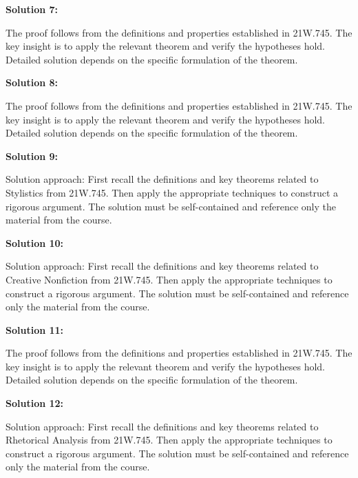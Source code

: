 \documentclass[12pt,a4paper]{exam}
\begin{document}
\vspace{0.5cm}

\textbf{Solution 7:}

The proof follows from the definitions and properties established in 21W.745. The key insight is to apply the relevant theorem and verify the hypotheses hold. Detailed solution depends on the specific formulation of the theorem.

\vspace{0.5cm}

\textbf{Solution 8:}

The proof follows from the definitions and properties established in 21W.745. The key insight is to apply the relevant theorem and verify the hypotheses hold. Detailed solution depends on the specific formulation of the theorem.

\vspace{0.5cm}

\textbf{Solution 9:}

Solution approach: First recall the definitions and key theorems related to Stylistics from 21W.745. Then apply the appropriate techniques to construct a rigorous argument. The solution must be self-contained and reference only the material from the course.

\vspace{0.5cm}

\textbf{Solution 10:}

Solution approach: First recall the definitions and key theorems related to Creative Nonfiction from 21W.745. Then apply the appropriate techniques to construct a rigorous argument. The solution must be self-contained and reference only the material from the course.

\vspace{0.5cm}

\textbf{Solution 11:}

The proof follows from the definitions and properties established in 21W.745. The key insight is to apply the relevant theorem and verify the hypotheses hold. Detailed solution depends on the specific formulation of the theorem.

\vspace{0.5cm}

\textbf{Solution 12:}

Solution approach: First recall the definitions and key theorems related to Rhetorical Analysis from 21W.745. Then apply the appropriate techniques to construct a rigorous argument. The solution must be self-contained and reference only the material from the course.
\end{document}
